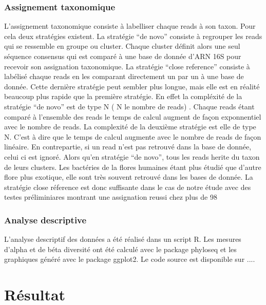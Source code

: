 \documentclass[12pt,a4paper]{article}
\begin{document}
\subsubsection{Assignement taxonomique}

L’assignement taxonomique consiste à labelliser chaque reads à son taxon. Pour cela deux stratégies existent.
La stratégie “de novo” consiste à regrouper les reads qui se ressemble en groupe ou cluster.
Chaque cluster définit alors une seul séquence consensus qui est comparé à une base de donnée d’ARN 16S pour recevoir son assignation taxonomique.
La stratégie “close reference” consiste à labélisé chaque reads en les comparant directement un par un à une base de donnée. Cette dernière stratégie peut sembler plus longue, mais elle est en réalité beaucoup plus rapide que la première stratégie. En effet la compléxité de la stratégie “de novo” est de type N ( N le nombre de reads) . Chaque reads étant comparé à l’ensemble des reads le temps de calcul augment de façon exponnentiel avec le nombre de reads.
La complexité de la deuxième stratégie est elle de type N. C’est à dire que le temps de calcul augmente avec le nombre de reads de façon linéaire. En contrepartie, si un read n’est pas retrouvé dans la base de donnée, celui ci est ignoré. Alors qu’en stratégie “de novo”, tous les reads herite du taxon de leurs clusters.
Les bactéries de la flores humaines étant plus étudié que d’autre flore plus exotique, elle sont très souvent retrouvé dans les bases de donnée. La stratégie close réference est donc suffisante dans le cas de notre étude avec des testes préliminiares montrant une assignation reussi chez plus de 98%

\subsubsection{Analyse descriptive}
L'analyse descriptif des données a été réalisé dans un script R. Les mesures d'alpha et de béta diversité ont été calculé avec le package phyloseq et les graphiques généré avec le package ggplot2. 
Le code source est disponible sur .... 

\section{Résultat}
\end{document}
